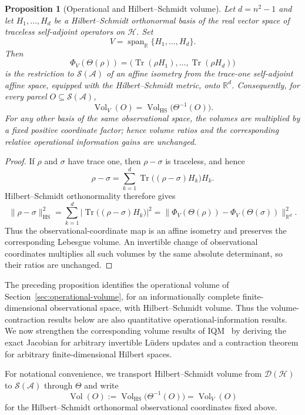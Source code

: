 \documentclass[11pt]{article}
\newtheorem{proposition}[theorem]{Proposition}
\begin{document}
\begin{proposition}[Operational and Hilbert--Schmidt volume]
\label{prop:operational-HS}
Let $d=n^2-1$ and let $H_1,\ldots,H_d$ be a Hilbert--Schmidt
orthonormal basis of the real vector space of traceless self-adjoint
operators on $\mathcal H$. Set
\[
V=\operatorname{span}_{\mathbb R}\{H_1,\ldots,H_d\}.
\]
Then
\[
\Phi_V(\Theta(\rho))
=
\bigl(
\operatorname{Tr}(\rho H_1),\ldots,
\operatorname{Tr}(\rho H_d)
\bigr)
\]
is the restriction to $\mathcal S(\mathcal A)$ of an affine isometry
from the trace-one self-adjoint affine space, equipped with the
Hilbert--Schmidt metric, onto $\mathbb R^d$. Consequently, for every
parcel $O\subseteq\mathcal S(\mathcal A)$,
\[
\operatorname{Vol}_V(O)
=
\operatorname{Vol}_{\mathrm{HS}}\bigl(\Theta^{-1}(O)\bigr).
\]
For any other basis of the same observational space, the volumes are
multiplied by a fixed positive coordinate factor; hence volume ratios and
the corresponding relative operational information gains are unchanged.
\end{proposition}
\begin{proof}
If $\rho$ and $\sigma$ have trace one, then $\rho-\sigma$ is traceless,
and hence
\[
\rho-\sigma
=
\sum_{k=1}^d
\operatorname{Tr}\bigl((\rho-\sigma)H_k\bigr)H_k.
\]
Hilbert--Schmidt orthonormality therefore gives
\[
\|\rho-\sigma\|_{\mathrm{HS}}^2
=
\sum_{k=1}^d
\left|
\operatorname{Tr}\bigl((\rho-\sigma)H_k\bigr)
\right|^2
=
\|\Phi_V(\Theta(\rho))-\Phi_V(\Theta(\sigma))\|_{\mathbb R^d}^2.
\]
Thus the observational-coordinate map is an affine isometry and
preserves the corresponding Lebesgue volume. An invertible change of
observational coordinates multiplies all such volumes by the same
absolute determinant, so their ratios are unchanged.
\end{proof}

The preceding proposition identifies the operational volume of
Section~\ref{sec:operational-volume}, for an informationally complete
finite-dimensional observational space, with Hilbert--Schmidt volume.
Thus the volume-contraction results below are also quantitative
operational-information results. We now strengthen the corresponding
volume results of IQM~\cite{Edalat2026} by deriving the exact Jacobian for arbitrary
invertible L\"uders updates and a contraction theorem for arbitrary
finite-dimensional Hilbert spaces.

For notational convenience, we transport Hilbert--Schmidt volume from
$\mathcal D(\mathcal H)$ to $\mathcal S(\mathcal A)$ through $\Theta$ and
write
\[
\operatorname{Vol}(O)
:=
\operatorname{Vol}_{\mathrm{HS}}\bigl(\Theta^{-1}(O)\bigr)
=
\operatorname{Vol}_V(O)
\]
for the Hilbert--Schmidt orthonormal observational coordinates fixed
above.
\end{document}
